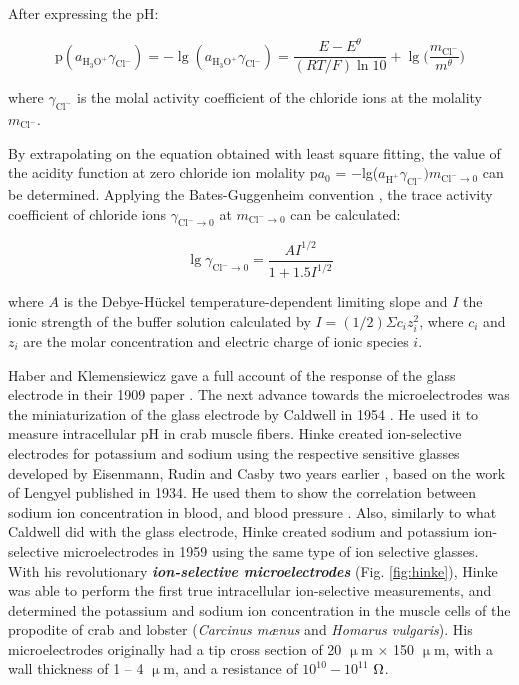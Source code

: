 After expressing the pH:

\begin{equation}
\textrm{p}(a_{\textrm{H}_3\textrm{O}^+}\gamma_{\textrm{Cl}^-}) = -\lg(a_{\textrm{H}_3\textrm{O}^+}\gamma_{\textrm{Cl}^-}) = \frac{E - E^\theta}{(RT/F)\ln10} + \lg \bigg(\frac{m_{\textrm{Cl}^-}}{m^\theta}\bigg)
\end{equation}

where $\gamma_{\textrm{Cl}^-}$ is the molal activity coefficient of the chloride ions at the molality $m_{\textrm{Cl}^-}$.

By extrapolating on the equation obtained with least square fitting, the value of the acidity function at zero chloride ion molality p$a_0$ = $-$lg($a_{\textrm{H}^+} \gamma _{\textrm{Cl}^-})m_{\textrm{Cl}^- \to 0}$ can be determined.
Applying the Bates-Guggenheim convention \cite{bates1960report}, the trace activity coefficient of chloride ions $\gamma_{\textrm{Cl}^- \to 0}$ at $m_{\textrm{Cl}^- \to 0}$ can be calculated:

\begin{equation}
\lg \gamma_{\textrm{Cl}^- \to 0} = \frac{A I^{1/2}}{1 + 1.5I^{1/2}}
\end{equation}

where $A$ is the Debye-Hückel temperature-dependent limiting slope and $I$ the ionic strength of the buffer solution calculated by $I = (1/2) \Sigma c_i z_{i}^{2}$, where $c_i$ and $z_i$ are the molar concentration and electric charge of ionic species $i$.

Haber and Klemensiewicz gave a full account of the response of the glass electrode in their 1909 paper \cite{haber1909elektrische, haber1909concerning}.
The next advance towards the microelectrodes was the miniaturization of the glass electrode by Caldwell in 1954 \cite{caldwell1954investigation}.
He used it to measure intracellular pH in crab muscle fibers.
Hinke created ion-selective electrodes for potassium and sodium using the respective sensitive glasses developed by Eisenmann, Rudin and Casby two years earlier \cite{eisenman1957glass}, based on the work of Lengyel \cite{lengyel1934behaviour} published in 1934.
He used them to show the correlation between sodium ion concentration in blood, and blood pressure \cite{friedman1958use, friedman1959drug}.
Also, similarly to what Caldwell did with the glass electrode, Hinke created sodium and potassium ion-selective microelectrodes in 1959 \cite{hinke1959glass} using the same type of ion selective glasses.
With his revolutionary \textbf{\emph{ion-selective microelectrodes}} (Fig. \ref{fig:hinke}), Hinke was able to perform the first true intracellular ion-selective measurements, and determined the potassium and sodium ion concentration in the muscle cells of the propodite of crab and lobster (\emph{Carcinus m\ae nus} and \emph{Homarus vulgaris}).
His microelectrodes originally had a tip cross section of 20 $\upmu$m $\times$ 150 $\upmu$m, with a wall thickness of 1 -- 4 $\upmu$m, and a resistance of $10^{10} - 10^{11}$ $\ohm$.


